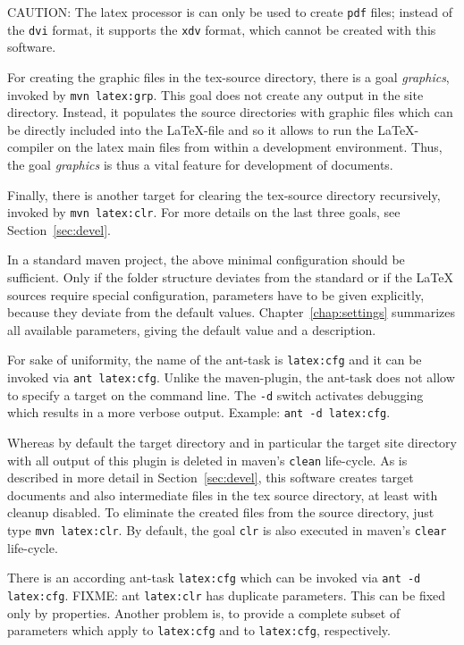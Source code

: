 CAUTION\@: The latex processor is \xelatex{} 
can only be used to create \texttt{pdf} files; 
instead of the \texttt{dvi} format, it supports the \texttt{xdv} format, 
which cannot be created with this software. 

For creating the graphic files in the tex-source directory, 
there is a goal \emph{graphics}, invoked by \texttt{mvn latex:grp}. 
This goal does not create any output in the site directory. 
Instead, it populates the source directories 
with graphic files which can be directly included into the \LaTeX-file 
and so it allows to run the \LaTeX-compiler on the latex main files 
from within a development environment. 
Thus, the goal \emph{graphics} is thus a vital feature 
for development of documents. 


Finally, there is another target for clearing the tex-source directory 
recursively, invoked by \texttt{mvn latex:clr}. 
For more details on the last three goals, see Section~\ref{sec:devel}. 

In a standard maven project, 
the above minimal configuration should be sufficient. 
Only if the folder structure deviates from the standard 
or if the \LaTeX{} sources require special configuration, 
parameters have to be given explicitly, 
because they deviate from the default values. 
Chapter~\ref{chap:settings} summarizes all available parameters, 
giving the default value and a description. 


For sake of uniformity, 
the name of the ant-task is \texttt{latex:cfg} 
and it can be invoked via \texttt{ant latex:cfg}. 
Unlike the maven-plugin, the ant-task 
does not allow to specify a target on the command line. 
The \texttt{-d} switch activates debugging 
which results in a more verbose output. 
Example: \texttt{ant -d latex:cfg}. 

Whereas by default the target directory and in particular 
the target site directory with all output of this plugin is deleted 
in maven's \texttt{clean} life-cycle. 
As is described in more detail in Section~\ref{sec:devel}, 
this software creates target documents and also intermediate files 
in the tex source directory, at least with cleanup disabled. 
To eliminate the created files from the source directory, 
just type \texttt{mvn latex:clr}. 
By default, the goal \texttt{clr} 
is also executed in maven's \texttt{clear} life-cycle. 

There is an according ant-task \texttt{latex:cfg} 
which can be invoked via \texttt{ant -d latex:cfg}. 
FIXME\@: ant  \texttt{latex:clr} has duplicate parameters. 
This can be fixed only by properties. 
Another problem is, to provide a complete subset of parameters 
which apply to \texttt{latex:cfg} and to \texttt{latex:cfg}, respectively. 

